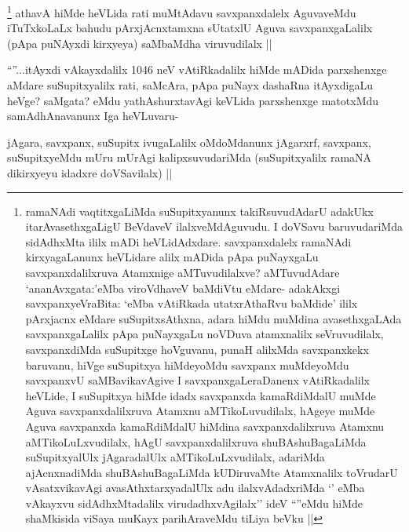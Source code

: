 
\begin{artha}
\footnote{ramaNAdi vaqtitxgaLiMda suSupitxyanunx takiRsuvudAdarU adakUkx itarAvasethxgaLigU BeVdaveV ilalxveMdAguvudu. I doVSavu baruvudariMda sidAdhxMta ililx mADi heVLidAdxdare. savxpanxdalelx ramaNAdi kirxyagaLanunx heVLidare alilx mADida pApa puNayxgaLu savxpanxdalilxruva Atamxnige aMTuvudilalxve? aMTuvudAdare `ananAvxgata:'eMba viroVdhaveV baMdiVtu eMdare- adakAkxgi savxpanxyeVraBita: `eMba vAtiRkada utatxrAthaRvu baMdide' ililx pArxjacnx eMdare suSupitxsAthxna, adara hiMdu muMdina avasethxgaLAda savxpanxgaLalilx pApa puNayxgaLu noVDuva atamxnalilx seVruvudilalx, savxpanxdiMda suSupitxge hoVguvanu, punaH alilxMda savxpanxkekx baruvanu, hiVge suSupitxya hiMdeyoMdu savxpanx muMdeyoMdu savxpanxvU saMBavikavAgive I savxpanxgaLeraDanenx vAtiRkadalilx heVLide, I suSupitxya hiMde idadx savxpanxda kamaRdiMdalU muMde Aguva savxpanxdalilxruva Atamxnu aMTikoLuvudilalx, hAgeye muMde Aguva savxpanxda kamaRdiMdalU hiMdina savxpanxdalilxruva Atamxnu aMTikoLuLxvudilalx, hAgU savxpanxdalilxruva shuBAshuBagaLiMda suSupitxyalUlx jAgaradalUlx aMTikoLuLxvudilalx, adariMda ajAcnxnadiMda shuBAshuBagaLiMda kUDiruvaMte Atamxnalilx toVrudarU vAsatxvikavAgi avasAthxtarxyadalUlx adu ilalxvAdadxriMda `\stext' eMba vAkayxvu sidAdhxMtadalilx virudadhxvAgilalx'' ideV ``\stext''eMdu hiMde shaMkisida viSaya muKayx parihAraveMdu tiLiya beVku ||}
athavA hiMde heVLida rati muMtAdavu savxpanxdalelx AguvaveMdu iTuTxkoLaLx bahudu pArxjAcnxtamxna sUtatxlU Aguva savxpanxgaLalilx (pApa puNAyxdi kirxyeya) saMbaMdha viruvudilalx ||
\end{artha}

\begin{artha}
``\stext''...itAyxdi vAkayxdalilx 1046 neV vAtiRkadalilx hiMde mADida parxshenxge aMdare suSupitxyalilx rati, saMcAra, pApa puNayx dashaRna itAyxdigaLu heVge? saMgata? eMdu yathAshurxtavAgi keVLida parxshenxge matotxMdu samAdhAnavanunx Iga heVLuvaru-
\end{artha}


\begin{artha}
jAgara, savxpanx, suSupitx ivugaLalilx oMdoMdanunx jAgarxrf, savxpanx, suSupitxyeMdu mUru mUrAgi kalipxsuvudariMda (suSupitxyalilx ramaNA dikirxyeyu idadxre doVSavilalx) ||
\end{artha}


